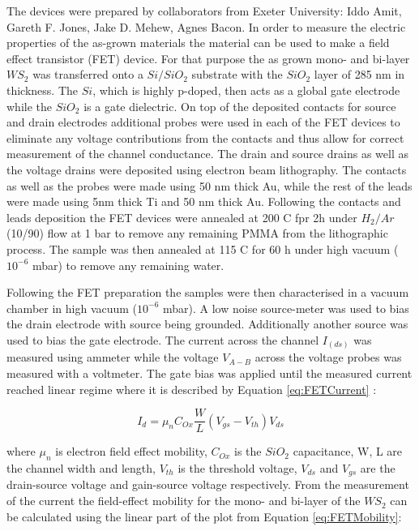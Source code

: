 The devices were prepared by collaborators from Exeter University: Iddo Amit, Gareth F. Jones, Jake D. Mehew, Agnes Bacon. In order to measure the electric properties of the as-grown materials the material can be used to make a field effect transistor (FET) device. For that purpose the as grown mono- and bi-layer $WS_2$ was transferred onto a $Si/SiO_2$ substrate with the $SiO_2$ layer of 285 nm in thickness. The $Si$, which is highly p-doped, then acts as a global gate electrode while the $SiO_2$ is a gate dielectric. On top of the deposited contacts for source and drain electrodes additional probes were used in each of the FET devices to eliminate any voltage contributions from the contacts and thus allow for correct measurement of the channel conductance. The drain and source drains as well as the voltage drains were deposited using electron beam lithography. The contacts as well as the probes were made using 50 nm thick Au, while the rest of the leads were made using 5nm thick Ti and 50 nm thick Au. Following the contacts and leads deposition the FET devices were annealed at 200 {\degree}C fpr 2h under $H_2/Ar$ (10/90) flow at 1 bar to remove any remaining PMMA from the lithographic process. The sample was then annealed at 115 {\degree}C for 60 h under high vacuum ($10^{-6}$ mbar) to remove any remaining water.

Following the FET preparation the samples were then characterised in a vacuum chamber in high vacuum ($10^{-6}$ mbar). A low noise source-meter was used to bias the drain electrode with source being grounded. Additionally another source was used to bias the gate electrode. The current across the channel $I_(ds)$ was measured using ammeter while the voltage $V_{A-B}$ across the voltage probes was measured with a voltmeter. The gate bias was applied until the measured current reached linear regime where it is described by Equation \ref{eq:FETCurrent} \cite{Sze2006}: 

\begin{equation}
I_d = {\mu}_nC_{Ox}\frac{W}{L}(V_{gs} - V_{th})V_{ds}
\label{eq:FETCurrent}
\end{equation}

where ${\mu}_n$ is electron field effect mobility, $C_{Ox}$ is the $SiO_2$ capacitance, W, L are the channel width and length, $V_{th}$ is the threshold voltage, $V_{ds}$ and $V_{gs}$ are the drain-source voltage and gain-source voltage respectively. From the measurement of the current the field-effect mobility for the mono- and bi-layer of the $WS_2$ can be calculated using the linear part of the plot from Equation \ref{eq:FETMobility}: 

